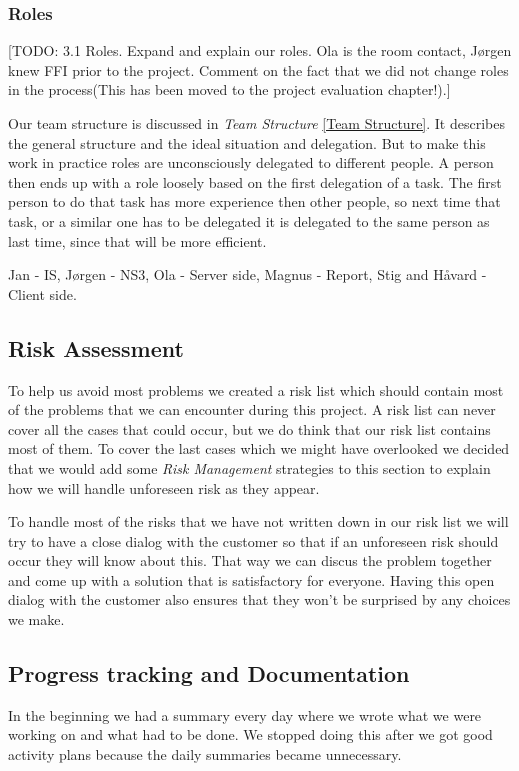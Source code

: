     \subsubsection{Roles}\label{roles}
    [TODO: 3.1 Roles. Expand and explain our roles. Ola is the room contact, Jørgen knew FFI prior to the project. Comment on the fact that we did not change roles in the process(This has been moved to the project evaluation chapter!).]
    
    Our team structure is discussed in \textit{Team Structure} \ref{Team Structure}. It describes the general structure and the ideal situation and delegation. 
    But to make this work in practice roles are unconsciously delegated to different people. A person then ends up with a role loosely based on the first delegation of a task. The first person to do that task has more experience then other people, so next time that task, or a similar one has to be delegated it is delegated to the same person as last time, since that will be more efficient. 
        
     Jan - IS, Jørgen - NS3, Ola - Server side, Magnus - Report, Stig and Håvard - Client side.
         
    \subsection{Risk Assessment}\label{Risk Assessment}
     To help us avoid most problems we created a risk list which should contain most of the problems that we can encounter during this project. A risk list can never cover all the cases that could occur, but we do think that our risk list contains most of them. To cover the last cases which we might have overlooked we decided that we would add some \textit{Risk Management} strategies to this section to explain how we will handle unforeseen risk as they appear. 
     
     To handle most of the risks that we have not written down in our risk list we will try to have a close dialog with the customer so that if an unforeseen risk should occur they will know about this. That way we can discus the problem together and come up with a solution that is satisfactory for everyone. Having this open dialog with the customer also ensures that they won't be surprised by any choices we make.

    \subsection{Progress tracking and Documentation}\label{Progress tracking and Documentation}
    In the beginning we had a summary every day where we wrote what we were working on and what had to be done. We stopped doing this after we got good activity plans because the daily summaries became unnecessary. 
    
